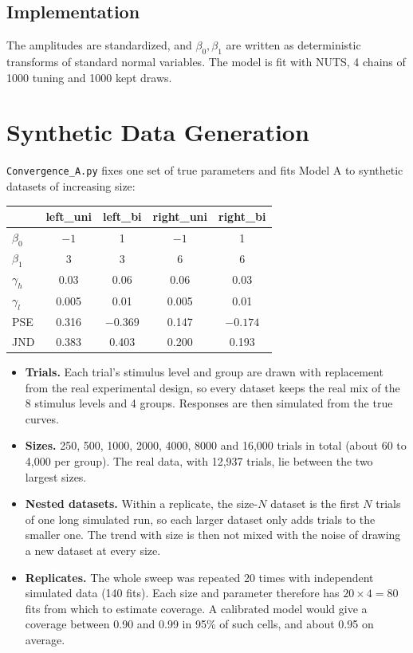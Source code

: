 \documentclass[11pt]{article}
\newcommand{\code}[1]{\texttt{#1}}
\begin{document}
\subsection{Implementation}

The amplitudes are standardized, and $\beta_0, \beta_1$ are written as
deterministic transforms of standard normal variables. The model is fit with
NUTS, 4 chains of 1000 tuning and 1000 kept draws.

\section{Synthetic Data Generation}

\code{Convergence\_A.py} fixes one set of true parameters and fits Model A to
synthetic datasets of increasing size:
\begin{center}
\begin{tabular}{lcccc}
\toprule
 & left\_uni & left\_bi & right\_uni & right\_bi \\
\midrule
$\beta_0$ & $-1$ & 1 & $-1$ & 1 \\
$\beta_1$ & 3 & 3 & 6 & 6 \\
$\gamma_h$ & 0.03 & 0.06 & 0.06 & 0.03 \\
$\gamma_l$ & 0.005 & 0.01 & 0.005 & 0.01 \\
\midrule
PSE & 0.316 & $-0.369$ & 0.147 & $-0.174$ \\
JND & 0.383 & 0.403 & 0.200 & 0.193 \\
\bottomrule
\end{tabular}
\end{center}

\begin{itemize}
  \item \textbf{Trials.} Each trial's stimulus level and group are drawn with
        replacement from the real experimental design, so every dataset keeps
        the real mix of the 8 stimulus levels and 4 groups. Responses are then
        simulated from the true curves.
  \item \textbf{Sizes.} 250, 500, 1000, 2000, 4000, 8000 and 16{,}000 trials in
        total (about 60 to 4{,}000 per group). The real data, with 12{,}937 trials,
        lie between the two largest sizes.
  \item \textbf{Nested datasets.} Within a replicate, the size-$N$ dataset is
        the first $N$ trials of one long simulated run, so each larger dataset only
        adds trials to the smaller one. The trend with size is then not mixed
        with the noise of drawing a new dataset at every size.
  \item \textbf{Replicates.} The whole sweep was repeated 20 times with
        independent simulated data (140 fits). Each size and parameter therefore
        has $20 \times 4 = 80$ fits from which to estimate coverage. A calibrated
        model would give a coverage between 0.90 and 0.99 in 95\% of such
        cells, and about 0.95 on average.
\end{itemize}
\end{document}
